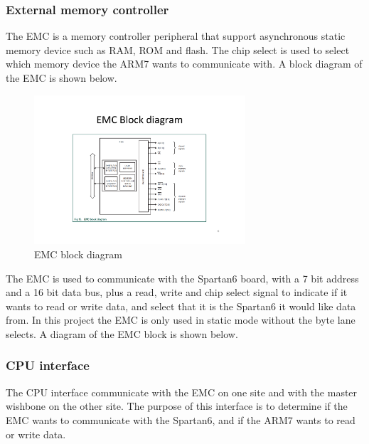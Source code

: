 \subsubsection{External memory controller}
The EMC is a memory controller peripheral that support asynchronous static memory device such as RAM, ROM and flash. The chip select is used to select which memory device the ARM7 wants to communicate with. A block diagram of the EMC is shown below.
\begin{figure}[H]
	\begin{centering}
		 \includegraphics[width=0.7\textwidth]{images/emb_block_diagram.pdf}
		\caption{EMC block diagram}
	\end{centering}
\end{figure}
The EMC is used to communicate with the Spartan6 board, with a 7 bit address and a 16 bit data bus, plus a read, write and chip select signal to indicate if it wants to read or write data, and select that it is the Spartan6 it would like data from. In this project the EMC is only used in static mode without the byte lane selects. A diagram of the EMC block is shown below.
\subsubsection{CPU interface}
The CPU interface communicate with the EMC on one site and with the master wishbone on the other site. The purpose of this interface is to determine if the EMC wants to communicate with the Spartan6, and if the ARM7 wants to read or write data.

